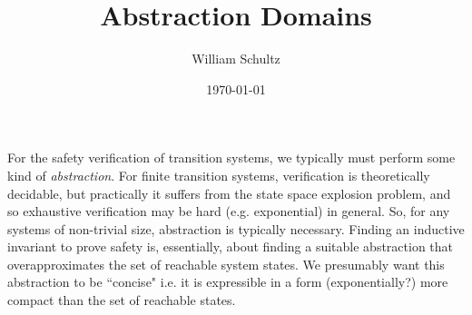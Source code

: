 \documentclass[10pt]{article}
\begin{document}
\title{Abstraction Domains}
\author{William Schultz}
\date{\today}

\maketitle










For the safety verification of transition systems, we typically must perform some kind of \textit{abstraction}. For finite transition systems, verification is theoretically decidable, but practically it suffers from the state space explosion problem, and so exhaustive verification may be hard (e.g. exponential) in general. So, for any systems of non-trivial size, abstraction is typically necessary. Finding an inductive invariant to prove safety is, essentially, about finding a suitable abstraction that overapproximates the set of reachable system states. We presumably want this abstraction to be ``concise" i.e. it is expressible in a form (exponentially?) more compact than the set of reachable states.
\end{document}

